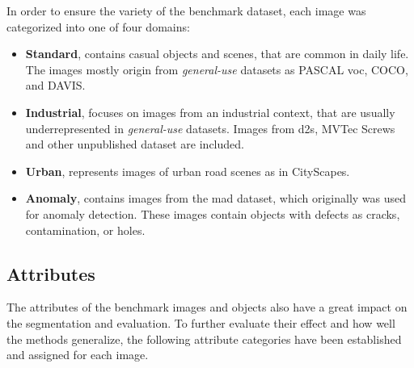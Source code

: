 In order to ensure the variety of the benchmark dataset, each image was categorized into one of four domains:
%
\begin{itemize}
	\item \textbf{Standard}, contains casual objects and scenes, that are common in daily life.
	The images mostly origin from \textit{general-use} datasets as PASCAL \gls{voc}, COCO, and DAVIS.
	\item \textbf{Industrial}, focuses on images from an industrial context, that are usually underrepresented in  \textit{general-use} datasets.
	Images from \gls{d2s}, MVTec Screws and other unpublished dataset are included.
	\item \textbf{Urban}, represents images of urban road scenes as in CityScapes.
	\item \textbf{Anomaly}, contains images from the \gls{mad} dataset, which originally was used for anomaly detection.
	These images contain objects with defects as \eg cracks, contamination, or holes.
\end{itemize}



\subsection{Attributes}\label{ord:ch4:sec2:subsec2}

The attributes of the benchmark images and objects also have a great impact on the segmentation and evaluation.
To further evaluate their effect and how well the methods generalize, the following attribute categories have been established and assigned for each image.

